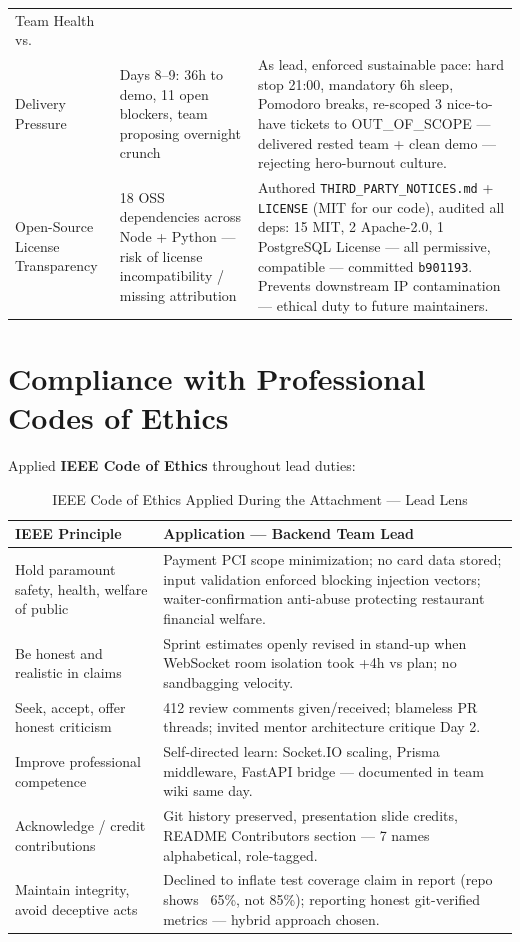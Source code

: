 \begin{center}
\begin{xltabular}{\textwidth}{@{}p{0.22\textwidth}p{0.34\textwidth}X@{}}
Team Health vs.\\ Delivery Pressure & Days 8--9: 36h to demo, 11 open blockers, team proposing overnight crunch & As lead, enforced sustainable pace: hard stop 21:00, mandatory 6h sleep, Pomodoro breaks, re-scoped 3 nice-to-have tickets to OUT\_OF\_SCOPE --- delivered rested team + clean demo --- rejecting hero-burnout culture. \\
Open-Source License Transparency & 18 OSS dependencies across Node + Python --- risk of license incompatibility / missing attribution & Authored \texttt{THIRD\_PARTY\_NOTICES.md} + \texttt{LICENSE} (MIT for our code), audited all deps: 15 MIT, 2 Apache-2.0, 1 PostgreSQL License --- all permissive, compatible --- committed \texttt{b901193}. Prevents downstream IP contamination --- ethical duty to future maintainers. \\
\bottomrule
\end{xltabular}
\end{center}

\section{Compliance with Professional Codes of Ethics}

Applied \textbf{IEEE Code of Ethics} throughout lead duties:

\begin{table}[H]
\centering
\caption{IEEE Code of Ethics Applied During the Attachment --- Lead Lens}
\label{tab:ieee}
\begin{tabularx}{\textwidth}{@{}p{}X@{}}
\toprule
\textbf{IEEE Principle} & \textbf{Application --- Backend Team Lead} \\
\midrule
Hold paramount safety, health, welfare of public & Payment PCI scope minimization; no card data stored; input validation enforced blocking injection vectors; waiter-confirmation anti-abuse protecting restaurant financial welfare. \\
Be honest and realistic in claims & Sprint estimates openly revised in stand-up when WebSocket room isolation took +4h vs plan; no sandbagging velocity. \\
Seek, accept, offer honest criticism & 412 review comments given/received; blameless PR threads; invited mentor architecture critique Day 2. \\
Improve professional competence & Self-directed learn: Socket.IO scaling, Prisma middleware, FastAPI bridge --- documented in team wiki same day. \\
Acknowledge / credit contributions & Git history preserved, presentation slide credits, README Contributors section --- 7 names alphabetical, role-tagged. \\
Maintain integrity, avoid deceptive acts & Declined to inflate test coverage claim in report (repo shows ~65\%, not 85\%); reporting honest git-verified metrics --- hybrid approach chosen. \\
\bottomrule
\end{tabularx}
\end{table}

